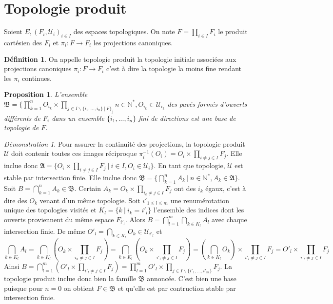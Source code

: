 \documentclass[a4paper, 11pt, french]{book}
\theoremstyle{plain} %
\newtheorem{proposition}{Proposition}
\theoremstyle{definition} %
\newtheorem{definition}{Définition}
\theoremstyle{remark} %
\newtheorem*{demonstration}{Démonstration}
\renewcommand{\setminus}{\backslash}
\newcommand{\1}{\mathds{1}}
\newcommand{\infegal}{\leqslant}
\newcommand{\inv}[1]{#1^{-1}}
\newcommand{\N}{\mathbb{N}}
\newcommand\ens[2]{\{#1 \ |\ #2\}}
\begin{document}
\section{Topologie produit}

Soient $E, (F_i, \mathscr{U}_i)_{i\in I}$ des espaces topologiques.
On note $F=\prod_{i\in I} F_i$ le produit cartésien des $F_i$ et $\pi_i\colon F\rightarrow F_i$ les projections canoniques.

\begin{definition}
	On appelle topologie produit la topologie initiale associées aux projections canoniques $\pi_i\colon F\rightarrow F_i$ c'est à dire la topologie la moins fine rendant les $\pi_i$ continues.
\end{definition}

\begin{proposition}
	L'ensemble $\mathfrak{B}=\{\prod_{k=1}^nO_{i_k}\times\prod_{j\in I\setminus\ens{i_1, ..., i_n\}}F_j}{n\in\N^*, O_{i_k}\in\mathscr{U}_{i_k}}$ des pavés formés d'ouverts différents de $F_i$ dans un ensemble $\{i_1,...,i_n\}$ fini de directions est une base de topologie de $F$.
\end{proposition}

\begin{demonstration}
	Pour assurer la continuité des projections, la topologie produit $\mathscr{U}$ doit contenir toutes ces images réciproque $\inv{\pi_i}(O_i)=O_i\times\prod_{i\neq j\in I}F_j$.
	Elle inclue donc $\mathfrak{A}=\ens{O_i\times\prod_{i\neq j\in I}F_j}{i\in I, O_i\in\mathscr{U}_i}$.
	En tant que topologie, $\mathscr{U}$ est stable par intersection finie.
	Elle inclue donc $\mathfrak{B}=\ens{\bigcap_{k=1}^nA_k}{n\in\N^*, A_k\in\mathfrak{A}}$.
	Soit $B=\bigcap_{k=1}^nA_k\in\mathfrak{B}$.
	Certain $A_k=O_k\times\prod_{i_k\neq j\in I}F_j$ ont des $i_k$ égaux, c'est à dire des $O_k$ venant d'un même topologie.
	Soit $i'_{1\infegal l\infegal m}$ une renumérotation unique des topologies visités et $K_l=\ens{k}{i_k=i'_l}$ l'ensemble des indices dont les ouverts proviennent du même espace $F_{i'_l}$.
	Alors $B=\bigcap_{l=1}^m\bigcap_{k\in K_l}A_l$ avec chaque intersection finie.
	De même $O'_l=\bigcap_{k\in K_l}O_k\in\mathscr{U}_{i'_l}$ et
	$$
		\bigcap_{k\in K_l}A_l
		=\bigcap_{k\in K_l}(O_k\times\prod_{i_k\neq j\in I}F_j)
		=\bigcap_{k\in K_l}(O_k\times\prod_{i'_l\neq j\in I}F_j)
		=(\bigcap_{k\in K_l}O_k)\times\prod_{i'_l\neq j\in I}F_j
		=O'_l\times\prod_{i'_l\neq j\in I}F_j
	$$
	Ainsi $B=\bigcap_{l=1}^m(O'_l\times\prod_{i'_l\neq j\in I}F_j)=\prod_{l=1}^mO'_l\times\prod_{j\in I\setminus\{i'_1,...,i'_m\}}F_j$.
	La topologie produit inclue donc bien la famille $\mathfrak{B}$ annoncée.
	C'est bien une base puisque pour $n=0$ on obtient $F\in\mathfrak{B}$ et qu'elle est par contruction stable par intersection finie.
\end{demonstration}
\end{document}
